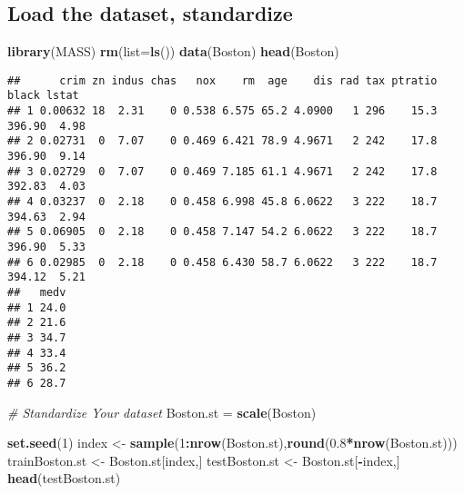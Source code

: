 \documentclass[
]{book}
\newenvironment{Shaded}{\begin{snugshade}}{\end{snugshade}}
\newcommand{\CommentTok}[1]{\textcolor[rgb]{0.56,0.35,0.01}{\textit{#1}}}
\newcommand{\DataTypeTok}[1]{\textcolor[rgb]{0.13,0.29,0.53}{#1}}
\newcommand{\DecValTok}[1]{\textcolor[rgb]{0.00,0.00,0.81}{#1}}
\newcommand{\FloatTok}[1]{\textcolor[rgb]{0.00,0.00,0.81}{#1}}
\newcommand{\KeywordTok}[1]{\textcolor[rgb]{0.13,0.29,0.53}{\textbf{#1}}}
\newcommand{\NormalTok}[1]{#1}
\newcommand{\OperatorTok}[1]{\textcolor[rgb]{0.81,0.36,0.00}{\textbf{#1}}}
\newcommand{\StringTok}[1]{\textcolor[rgb]{0.31,0.60,0.02}{#1}}
\begin{document}
\hypertarget{load-the-dataset-standardize}{%
\subsection{Load the dataset, standardize}\label{load-the-dataset-standardize}}

\begin{Shaded}
\begin{Highlighting}[]
\KeywordTok{library}\NormalTok{(MASS)}
\KeywordTok{rm}\NormalTok{(}\DataTypeTok{list=}\KeywordTok{ls}\NormalTok{())}
\KeywordTok{data}\NormalTok{(Boston)}
\KeywordTok{head}\NormalTok{(Boston)}
\end{Highlighting}
\end{Shaded}

\begin{verbatim}
##      crim zn indus chas   nox    rm  age    dis rad tax ptratio  black lstat
## 1 0.00632 18  2.31    0 0.538 6.575 65.2 4.0900   1 296    15.3 396.90  4.98
## 2 0.02731  0  7.07    0 0.469 6.421 78.9 4.9671   2 242    17.8 396.90  9.14
## 3 0.02729  0  7.07    0 0.469 7.185 61.1 4.9671   2 242    17.8 392.83  4.03
## 4 0.03237  0  2.18    0 0.458 6.998 45.8 6.0622   3 222    18.7 394.63  2.94
## 5 0.06905  0  2.18    0 0.458 7.147 54.2 6.0622   3 222    18.7 396.90  5.33
## 6 0.02985  0  2.18    0 0.458 6.430 58.7 6.0622   3 222    18.7 394.12  5.21
##   medv
## 1 24.0
## 2 21.6
## 3 34.7
## 4 33.4
## 5 36.2
## 6 28.7
\end{verbatim}

\begin{Shaded}
\begin{Highlighting}[]
\CommentTok{# Standardize Your dataset}
\NormalTok{Boston.st =}\StringTok{ }\KeywordTok{scale}\NormalTok{(Boston)}

\KeywordTok{set.seed}\NormalTok{(}\DecValTok{1}\NormalTok{)}
\NormalTok{index <-}\StringTok{ }\KeywordTok{sample}\NormalTok{(}\DecValTok{1}\OperatorTok{:}\KeywordTok{nrow}\NormalTok{(Boston.st),}\KeywordTok{round}\NormalTok{(}\FloatTok{0.8}\OperatorTok{*}\KeywordTok{nrow}\NormalTok{(Boston.st)))}
\NormalTok{trainBoston.st <-}\StringTok{ }\NormalTok{Boston.st[index,]}
\NormalTok{testBoston.st <-}\StringTok{ }\NormalTok{Boston.st[}\OperatorTok{-}\NormalTok{index,]}
\KeywordTok{head}\NormalTok{(testBoston.st)}
\end{Highlighting}
\end{Shaded}
\end{document}
